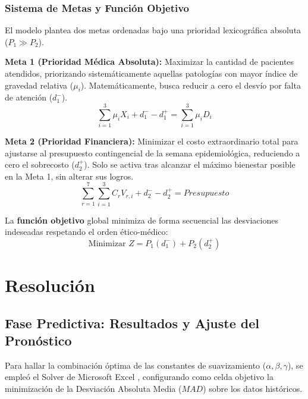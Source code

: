 \documentclass[conference]{IEEEtran}
\begin{document}
\subsubsection{Sistema de Metas y Función Objetivo}
El modelo plantea dos metas ordenadas bajo una prioridad lexicográfica absoluta ($P_1 \gg P_2$).

\textbf{Meta 1 (Prioridad Médica Absoluta):} Maximizar la cantidad de pacientes atendidos, priorizando sistemáticamente aquellas patologías con mayor índice de gravedad relativa ($\mu_i$). Matemáticamente, busca reducir a cero el desvío por falta de atención ($d_1^-$).
\begin{equation}
    \sum_{i=1}^{3} \mu_i X_i + d_1^- - d_1^+ = \sum_{i=1}^{3} \mu_i D_i
\end{equation}

\textbf{Meta 2 (Prioridad Financiera):} Minimizar el costo extraordinario total para ajustarse al presupuesto contingencial de la semana epidemiológica, reduciendo a cero el sobrecosto ($d_2^+$). Solo se activa tras alcanzar el máximo bienestar posible en la Meta 1, sin alterar sus logros.
\begin{equation}
    \sum_{r=1}^{7} \sum_{i=1}^{3} C_r V_{r,i} + d_2^- - d_2^+ = Presupuesto
\end{equation}

La \textbf{función objetivo} global minimiza de forma secuencial las desviaciones indeseadas respetando el orden ético-médico:
\begin{equation}
    \text{Minimizar } Z = P_1(d_1^-) + P_2(d_2^+)
\end{equation}

\section{Resolución}

\subsection{Fase Predictiva: Resultados y Ajuste del Pronóstico}
Para hallar la combinación óptima de las constantes de suavizamiento ($\alpha, \beta, \gamma$), se empleó el Solver de Microsoft Excel \cite{refExcel}, configurando como celda objetivo la minimización de la Desviación Absoluta Media ($MAD$) sobre los datos históricos.
\end{document}
